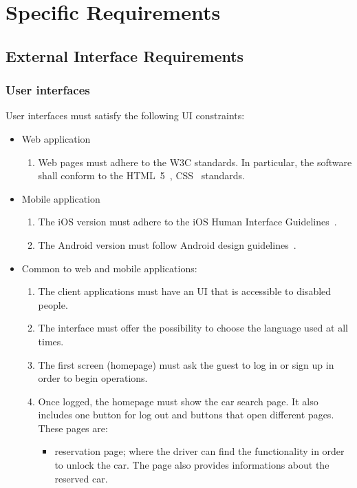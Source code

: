 \section{Specific Requirements}\label{sec requirements}

\subsection{External Interface Requirements}

\subsubsection{User interfaces}

User interfaces must satisfy the following UI constraints:
\begin{itemize}
	\item Web application
	\begin{enumerate}
		\item Web pages must adhere to the W3C standards. In particular, the software shall conform to the HTML~5~\cite{w3c-html5}, CSS~\cite{w3c-css} standards.
	\end{enumerate}
	\item Mobile application
	\begin{enumerate}
		\item The iOS version must adhere to the iOS Human Interface Guidelines~\cite{apple-ios-hig}.
		\item The Android version must follow Android design guidelines~\cite{google-android-hig}.
	\end{enumerate}
		\item Common to web and mobile applications:
		\begin{enumerate}
			\item The client applications must have an UI that is accessible to disabled people.
			\item The interface must offer the possibility to choose the language used at all times.
			\item The first screen (homepage) must ask the guest to log in or sign up in order to begin operations.
			\item Once logged, the homepage must show the car search page. It also includes one button for log out and buttons that open different pages. These pages are:
				\begin{itemize}
					\item reservation page; where the driver can find the functionality in order to unlock the car. The page also provides informations about the reserved car.

\end{itemize}
\end{enumerate}
\end{itemize}
